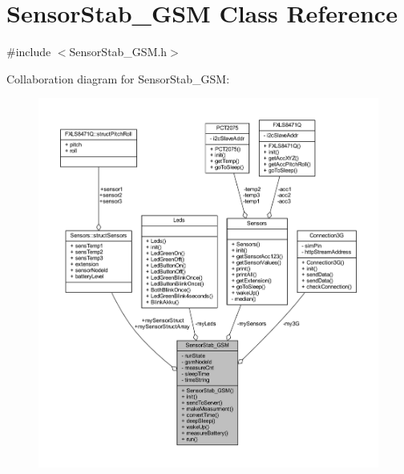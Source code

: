 \hypertarget{class_sensor_stab___g_s_m}{}\section{Sensor\+Stab\+\_\+\+G\+SM Class Reference}
\label{class_sensor_stab___g_s_m}


{\ttfamily \#include $<$Sensor\+Stab\+\_\+\+G\+S\+M.\+h$>$}



Collaboration diagram for Sensor\+Stab\+\_\+\+G\+SM\+:\nopagebreak
\begin{figure}[H]
\begin{center}
\leavevmode
\includegraphics[width=350pt]{class_sensor_stab___g_s_m__coll__graph}
\end{center}
\end{figure}
